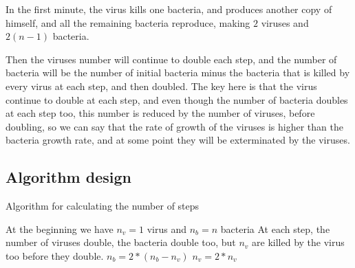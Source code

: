 \documentclass{article}
\begin{document}
In the first minute, the virus kills one bacteria, and produces another copy of himself, and all the remaining bacteria reproduce, making $2$ viruses and $2(n-1)$ bacteria.

Then the viruses number will continue to double each step, and the number of bacteria will be the number of initial bacteria minus the bacteria that is killed by every virus at each step, and then doubled. The key here is that the virus continue to double at each step, and even though the number of bacteria doubles at each step too, this number is reduced by the number of viruses, before doubling, so we can say that the rate of growth of the viruses is higher than the bacteria growth rate, and at some point they will be exterminated by the viruses.

\subsection*{Algorithm design}

\begin{algorithm}[H]
\caption{Algorithm for calculating the number of steps}
\begin{algorithmic}[1]
\State At the beginning we have $n_v = 1$ virus and $n_b = n$ bacteria
\State At each step, the number of viruses double, the bacteria double too, but $n_v$ are killed by the virus too before they double.
 \State $n_b = 2*(n_b-n_v)$
 \State $n_v = 2*n_v$
\EndWhile
\end{algorithmic}
\end{algorithm}
\end{document}

